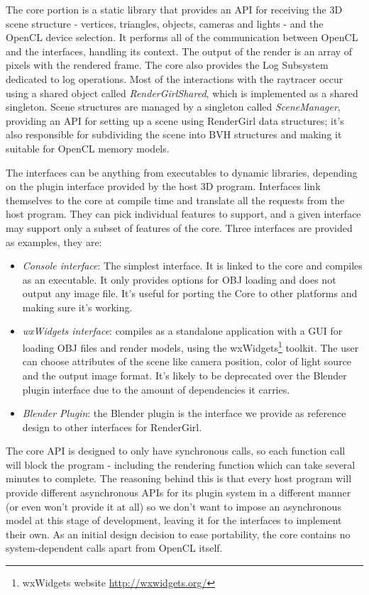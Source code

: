 \documentclass{vgtc}
\begin{document}
The core portion is a static library that provides an API for
receiving the 3D scene structure - vertices, triangles, objects,
cameras and lights - and the OpenCL device selection. It performs all of the
communication between OpenCL and the interfaces, handling its
context. The output of the render is an array of pixels with the
rendered frame. The core also provides the Log Subsystem dedicated to
log operations. Most of the interactions with the raytracer occur
using a shared object called \emph{RenderGirlShared}, which is
implemented as a shared singleton. Scene structures are managed by a
singleton called \emph{SceneManager}, providing an API for setting up
a scene using RenderGirl data structures; it's also responsible for
subdividing the scene into BVH structures and making it suitable for
OpenCL memory models.


The interfaces can be anything from executables to dynamic libraries,
depending on the plugin interface provided by the host 3D
program. Interfaces link themselves to the core at compile time and translate
all the requests from the host program. They can pick individual
features to support, and a given interface may support only a subset
of features of the core. Three interfaces are provided as examples,
they are:

\begin{itemize}
\item \emph{Console interface}: The simplest interface. It is linked to
  the core and compiles as an executable. It only provides options for
  OBJ loading and does not output any image file. It's useful for
  porting the Core to other platforms and making sure it's working.
\item \emph{wxWidgets interface}: compiles as a standalone
  application with a GUI for loading OBJ files and render models,
  using the wxWidgets\footnote{wxWidgets website
    \url{http://wxwidgets.org/}} toolkit. The user can choose
  attributes of the scene like camera position, color of light source
  and the output image format. It's likely to be deprecated over the
  Blender plugin interface due to the amount of dependencies it
  carries.
\item \emph{Blender Plugin}: the Blender plugin is the interface we
  provide as reference design to other interfaces for RenderGirl.
\end{itemize}

The core API is designed to only have synchronous calls, so each
function call will block the program - including the rendering
function which can take several minutes to complete. The reasoning
behind this is that every host program will provide different
asynchronous APIs for its plugin system in a different manner (or even won't
provide it at all) so we don't want to impose an asynchronous model at
this stage of development, leaving it for the interfaces to implement
their own. As an initial design decision to ease portability, the core
contains no system-dependent calls apart from OpenCL itself.
\end{document}
